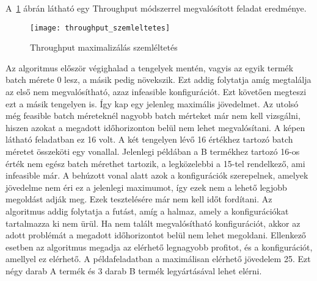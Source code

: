 A~\ref{throughput_szemleltetes} ábrán látható egy Throughput módszerrel megvalósított feladat eredménye.
\begin{figure}[H]
\begin{center}
\texttt{[image: throughput\_szemleltetes]}
\caption{Throughput maximalizálás szemléltetés}
\label{throughput_szemleltetes}
\end{center}
\end{figure}
Az algoritmus először végighalad a tengelyek mentén, vagyis az egyik termék batch mérete 0 lesz, a másik pedig növekszik. Ezt addig folytatja amíg megtalálja az első nem megvalósítható, azaz infeasible konfigurációt. Ezt követően megteszi ezt a másik tengelyen is. Így kap egy jelenleg maximális jövedelmet. Az utolsó még feasible batch méreteknél nagyobb batch mérteket már nem kell vizsgálni, hiszen azokat a megadott időhorizonton belül nem lehet megvalósítani. A képen látható feladatban ez 16 volt. A két tengelyen lévő 16 értékhez tartozó batch méretet összeköti egy vonallal. Jelenlegi példában a B termékhez tartozó 16-os érték nem egész batch mérethet tartozik, a legközelebbi a 15-tel rendelkező, ami infeasible már. A behúzott vonal alatt azok a konfigurációk szerepelnek, amelyek jövedelme nem éri ez a jelenlegi maximumot, így ezek nem a lehető legjobb megoldást adják meg. Ezek tesztelésére már nem kell időt fordítani. Az algoritmus addig folytatja a futást, amíg a halmaz, amely a konfigurációkat tartalmazza ki nem ürül. Ha nem talált megvalósítható konfigurációt, akkor az adott problémát a megadott időhorizontot belül nem lehet megoldani. Ellenkező esetben az algoritmus megadja az elérhető legnagyobb profitot, és a konfigurációt, amellyel ez elérhető. A példafeladatban a maximálisan elérhető jövedelem 25. Ezt négy darab A termék és 3 darab B termék legyártásával lehet elérni.